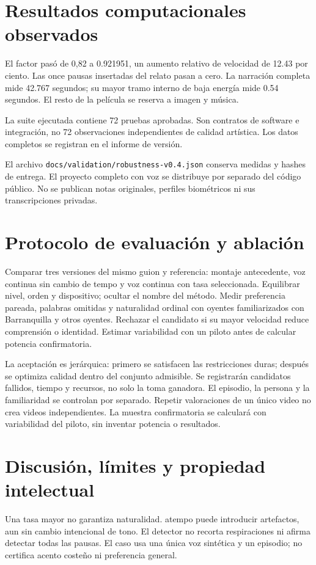 \documentclass[10pt,a4paper]{article}
\begin{document}
\section{Resultados computacionales observados}
El factor pasó de 0,82 a 0.921951, un aumento relativo de velocidad de 12.43 por ciento. Las once pausas insertadas del relato pasan a cero. La narración completa mide 42.767 segundos; su mayor tramo interno de baja energía mide 0.54 segundos. El resto de la película se reserva a imagen y música.

La suite ejecutada contiene 72 pruebas aprobadas. Son contratos de software e integración, no 72 observaciones independientes de calidad artística. Los datos completos se registran en el informe de versión.

El archivo \texttt{docs/validation/robustness-v0.4.json} conserva medidas y hashes de entrega. El proyecto completo con voz se distribuye por separado del código público. No se publican notas originales, perfiles biométricos ni sus transcripciones privadas.
\section{Protocolo de evaluación y ablación}
Comparar tres versiones del mismo guion y referencia: montaje antecedente, voz continua sin cambio de tempo y voz continua con tasa seleccionada. Equilibrar nivel, orden y dispositivo; ocultar el nombre del método. Medir preferencia pareada, palabras omitidas y naturalidad ordinal con oyentes familiarizados con Barranquilla y otros oyentes. Rechazar el candidato si su mayor velocidad reduce comprensión o identidad. Estimar variabilidad con un piloto antes de calcular potencia confirmatoria.

La aceptación es jerárquica: primero se satisfacen las restricciones duras; después se optimiza calidad dentro del conjunto admisible. Se registrarán candidatos fallidos, tiempo y recursos, no solo la toma ganadora. El episodio, la persona y la familiaridad se controlan por separado. Repetir valoraciones de un único video no crea videos independientes. La muestra confirmatoria se calculará con variabilidad del piloto, sin inventar potencia o resultados.
\section{Discusión, límites y propiedad intelectual}
Una tasa mayor no garantiza naturalidad. atempo puede introducir artefactos, aun sin cambio intencional de tono. El detector no recorta respiraciones ni afirma detectar todas las pausas. El caso usa una única voz sintética y un episodio; no certifica acento costeño ni preferencia general.
\end{document}
